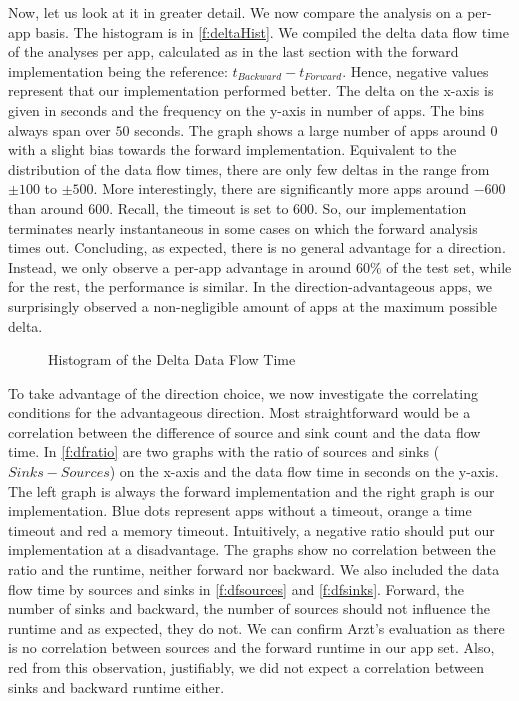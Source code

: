 \documentclass[../draft.tex]{subfiles}
\begin{document}
    Now, let us look at it in greater detail. We now compare the analysis on a per-app basis. 
    The histogram is in \autoref{f:deltaHist}. 
    We compiled the delta data flow time of the analyses per app, calculated as in the last section with the forward implementation being the reference: $t_{\mathit{Backward}} - t_{\mathit{Forward}}$. 
    Hence, negative values represent that our implementation performed better. 
    The delta on the x-axis is given in seconds and the frequency on the y-axis in number of apps. 
    The bins always span over $50$ seconds.
    The graph shows a large number of apps around $0$ with a slight bias towards the forward implementation. 
    Equivalent to the distribution of the data flow times, there are only few deltas in the range from $\pm100$ to $\pm500$. 
    More interestingly, there are significantly more apps around $-600$ than around $600$. 
    Recall, the timeout is set to $600$.
    So, our implementation terminates nearly instantaneous in some cases on which the forward analysis times out.
    Concluding, as expected, there is no general advantage for a direction. 
    Instead, we only observe a per-app advantage in around $60\%$ of the test set, while for the rest, the performance is similar.
    In the direction-advantageous apps, we surprisingly observed a non-negligible amount of apps at the maximum possible delta.  

    \begin{figure}[ht]
        \centering
        \resizebox{0.75\columnwidth}{!}{
            
        }
        \caption{Histogram of the Delta Data Flow Time}
        \label{f:deltaHist}
    \end{figure}

    To take advantage of the direction choice, we now investigate the correlating conditions for the advantageous direction. 
    Most straightforward would be a correlation between the difference of source and sink count and the data flow time. 
    In \autoref{f:dfratio} are two graphs with the ratio of sources and sinks ($\mathit{Sinks} - \mathit{Sources}$) on the x-axis and the data flow time in seconds on the y-axis.
    The left graph is always the forward implementation and the right graph is our implementation. 
    Blue dots represent apps without a timeout, orange a time timeout and red a memory timeout. 
    Intuitively, a negative ratio should put our implementation at a disadvantage. The graphs show no correlation between the ratio and the runtime, neither forward nor backward. 
    We also included the data flow time by sources and sinks in \autoref{f:dfsources} and \autoref{f:dfsinks}. 
    Forward, the number of sinks and backward, the number of sources should not influence the runtime and as expected, they do not. 
    We can confirm Arzt's evaluation\cite{Arzt2017PhD} as there is no correlation between sources and the forward runtime in our app set. 
    Also, red from this observation, justifiably, we did not expect a correlation between sinks and backward runtime either. 
\end{document}
